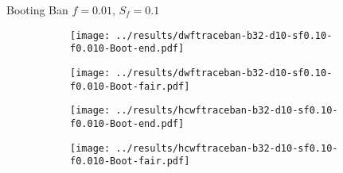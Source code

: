 \documentclass[8pt,a4paper]{beamer}
\begin{document}
	
\begin{frame}{Booting Ban $f=0.01,\, S_f=0.1$}
	\begin{figure}
		\begin{subfigure}{.48\textwidth}
			\centering
			\texttt{[image: ../results/dwftraceban-b32-d10-sf0.10-f0.010-Boot-end.pdf]}
		\end{subfigure}
		\begin{subfigure}{.48\textwidth}
			\centering
			\texttt{[image: ../results/dwftraceban-b32-d10-sf0.10-f0.010-Boot-fair.pdf]}
		\end{subfigure}
	\end{figure}

	\begin{figure}
	\begin{subfigure}{.48\textwidth}
		\centering
		\texttt{[image: ../results/hcwftraceban-b32-d10-sf0.10-f0.010-Boot-end.pdf]}
	\end{subfigure}
	\begin{subfigure}{.48\textwidth}
		\centering
		\texttt{[image: ../results/hcwftraceban-b32-d10-sf0.10-f0.010-Boot-fair.pdf]}
	\end{subfigure}
	\end{figure}
\end{frame}

%
%	
%
%
\end{document}
